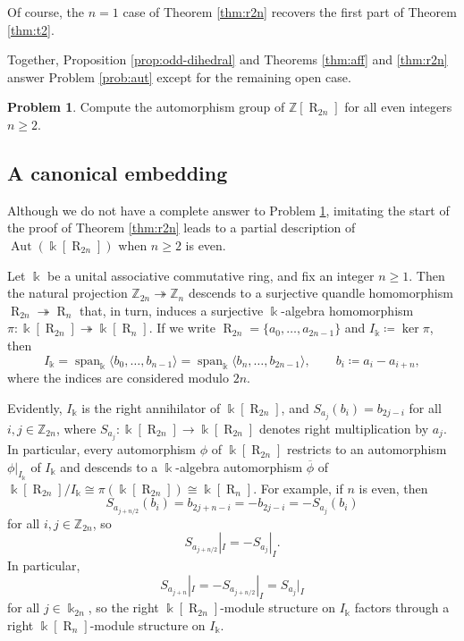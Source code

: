 \documentclass[12 pt]{amsart}
\theoremstyle{definition}
\newtheorem{problem}[theorem]{Problem}
\theoremstyle{remark}
\numberwithin{equation}{section}
\newcommand{\Aut}{\operatorname{Aut}}
\newcommand{\R}{\operatorname{R}}
\newcommand{\Z}{\mathbb{Z}}
\renewcommand{\k}{\Bbbk}
\begin{document}
Of course, the $n=1$ case of Theorem \ref{thm:r2n} recovers the first part of Theorem \ref{thm:t2}.

Together, Proposition \ref{prop:odd-dihedral} and Theorems \ref{thm:aff} and \ref{thm:r2n} answer Problem \ref{prob:aut} except for the remaining open case.

\begin{problem}\label{prob:aut-even}
    Compute the automorphism group of $\Z[\R_{2n}]$ for all even integers $n\geq 2$.
\end{problem}

\subsection{A canonical embedding}
Although we do not have a complete answer to Problem \ref{prob:aut-even}, imitating the start of the proof of Theorem \ref{thm:r2n} leads to a partial description of $\Aut(\k[\R_{2n}])$ when $n\geq 2$ is even.

Let $\k$ be a unital associative commutative ring, and fix an integer $n\geq 1$. Then the natural projection $\Z_{2n}\twoheadrightarrow\Z_n$ descends to a surjective quandle homomorphism $\R_{2n}\twoheadrightarrow\R_n$ that, in turn, induces a surjective $\k$-algebra homomorphism $\pi\colon \k[\R_{2n}]\twoheadrightarrow\k[\R_n]$. If we write $\R_{2n}=\{a_0,\dots,a_{2n-1}\}$ and $I_\k\coloneq \ker\pi$, then
    \[
    I_\k=\operatorname{span}_\k\langle b_0,\dots,b_{n-1}\rangle=\operatorname{span}_\k\langle b_n,\dots,b_{2n-1}\rangle,\qquad b_i\coloneq a_i-a_{i+n},
    \]
    where the indices are considered modulo $2n$. 
    
    Evidently, $I_\k$ is the right annihilator of $\k[\R_{2n}]$, and $S_{a_j}(b_i)=b_{2j-i}$ for all $i,j\in\Z_{2n}$, where $S_{a_j}\colon\k[\R_{2n}]\to\k[\R_{2n}]$ denotes right multiplication by $a_j$. In particular, every automorphism $\phi$ of $\k[\R_{2n}]$ restricts to an automorphism $\phi|_{I_\k}$ of $I_\k$ and descends to a $\k$-algebra automorphism $\overline{\phi}$ of $\k[\R_{2n}]/I_\k\cong\pi(\k[\R_{2n}])\cong\k[\R_n]$. For example, if $n$ is even, then
    \[
   S_{a_{j+n/2}}(b_i)=b_{2j+n-i}=-b_{2j-i}=-S_{a_j}(b_i)
    \]
    for all $i,j\in\Z_{2n}$, so \begin{equation}\label{eq:saj}
        S_{a_{j+n/2}}|_I=-S_{a_j}|_I.
    \end{equation}
    In particular, 
    \begin{equation}\label{eq:saj2}
        S_{a_{j+n}}|_I=-S_{a_{j+n/2}}|_I=S_{a_j}|_I
    \end{equation}
    for all $j\in\k_{2n}$, so the right $\k[\R_{2n}]$-module structure on $I_\k$ factors through a right $\k[\R_n]$-module structure on $I_\k$.
\end{document}
